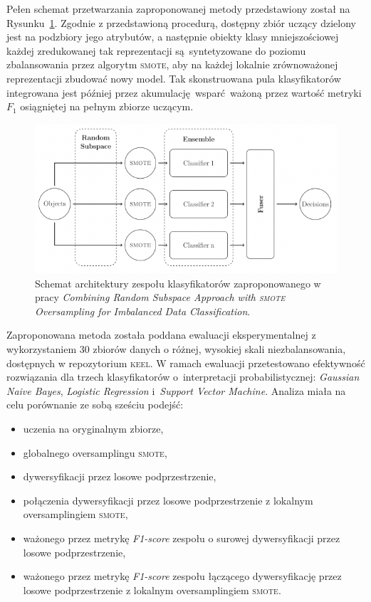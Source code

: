 Pełen schemat przetwarzania zaproponowanej metody przedstawiony został na Rysunku~\ref{fig:hais}. Zgodnie z przedstawioną procedurą, dostępny zbiór uczący dzielony jest na podzbiory jego atrybutów, a następnie obiekty klasy mniejszościowej każdej zredukowanej tak reprezentacji są syntetyzowane do poziomu zbalansowania przez algorytm \textsc{smote}, aby na każdej lokalnie zrównoważonej reprezentacji zbudować nowy model. Tak skonstruowana pula klasyfikatorów integrowana jest później przez akumulację wsparć ważoną przez wartość metryki $F_1$ osiągniętej na pełnym zbiorze uczącym.

\begin{figure}[h]
	\centering
	\includegraphics[width=\textwidth]{figures/hais}
	\caption{Schemat architektury zespołu klasyfikatorów zaproponowanego w pracy \emph{Combining Random Subspace Approach with \textsc{smote} Oversampling for Imbalanced Data Classification}.}\label{fig:hais}
\end{figure}

Zaproponowana metoda została poddana ewaluacji eksperymentalnej z wykorzystaniem 30 zbiorów danych o różnej, wysokiej skali niezbalansowania, dostępnych w repozytorium \textsc{keel}. W ramach ewaluacji przetestowano efektywność rozwiązania dla trzech klasyfikatorów o~interpretacji probabilistycznej: \emph{Gaussian Naive Bayes}, \emph{Logistic Regression} i~\emph{Support Vector Machine}. Analiza miała na celu porównanie ze sobą sześciu podejść:

\begin{itemize}
	\item uczenia na oryginalnym zbiorze,
	\item globalnego oversamplingu \textsc{smote},
	\item dywersyfikacji przez losowe podprzestrzenie,
	\item połączenia dywersyfikacji przez losowe podprzestrzenie z lokalnym oversamplingiem \textsc{smote},
	\item ważonego przez metrykę \emph{F1-score} zespołu o surowej dywersyfikacji przez losowe podprzestrzenie,
	\item ważonego przez metrykę \emph{F1-score} zespołu łączącego dywersyfikację przez losowe podprzestrzenie z lokalnym oversamplingiem \textsc{smote}.
\end{itemize}

